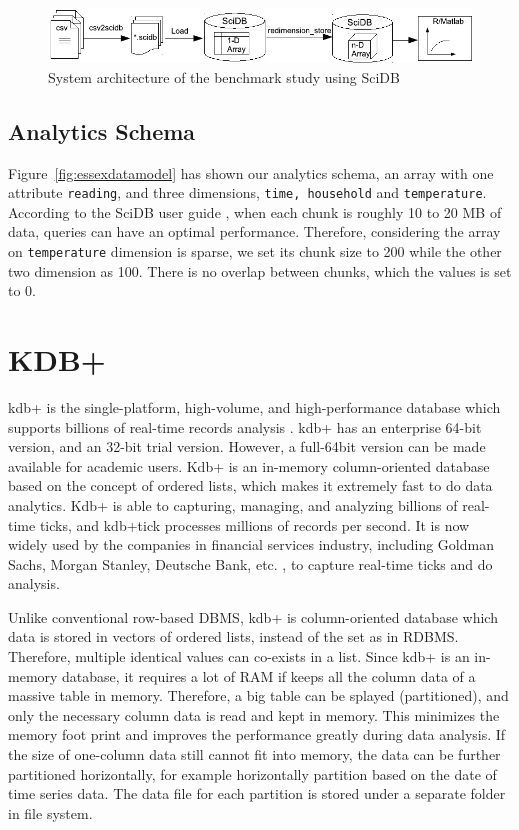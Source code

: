 \documentclass[a4paper,12pt]{llncs}
\begin{document}
\begin{figure}[htp]
\centering
\includegraphics[width=370 px]{images/scidbbenchmarksystem}
\caption{System architecture of the benchmark study using SciDB}
\label{fig:scidbbenchmarksystem}
\vspace{-10pt}
\end{figure}



\subsection{Analytics Schema}
Figure~\ref{fig:essexdatamodel} has shown our analytics schema, an array with one attribute \texttt{reading}, and three dimensions, \texttt{time, household} and \texttt{temperature}. According to the SciDB user guide \cite{scidbuserguide}, when each chunk is roughly 10 to 20 MB of data, queries can have an optimal performance. Therefore, considering the array on \texttt{temperature} dimension is sparse, we set its chunk size to 200 while the other two dimension as 100. There is no overlap between chunks, which the values is set to 0. 

\section{KDB+}
kdb+ is the single-platform, high-volume, and high-performance database which supports billions of real-time records analysis \cite{kdb}. kdb+ has an enterprise 64-bit version, and an 32-bit trial version. However,  a full-64bit version can be made available for academic users. Kdb+ is an in-memory column-oriented database based on the concept of ordered lists, which makes it extremely fast to do data analytics. Kdb+ is able to capturing, managing, and analyzing billions of real-time ticks,  and kdb+tick processes millions of records per second. It is now widely used by the companies in financial services industry, including Goldman Sachs, Morgan Stanley, Deutsche Bank, etc. \cite{kdbusers}, to capture real-time ticks and do analysis.

Unlike conventional row-based DBMS, kdb+ is column-oriented database which data is stored in vectors of ordered lists, instead of the set as in RDBMS. Therefore, multiple identical values can co-exists in a list. Since kdb+ is an in-memory database, it requires a lot of RAM if keeps all the column data of a massive table  in memory. Therefore,  a big table can be splayed (partitioned), and only the necessary column data is read and kept in memory. This minimizes the memory foot print and improves the performance greatly during data analysis. If the size of one-column data still cannot fit into memory, the data can be further partitioned horizontally, for example horizontally partition based on the date of time series data. The data file for each partition is stored under a separate folder in file system.
\end{document}
